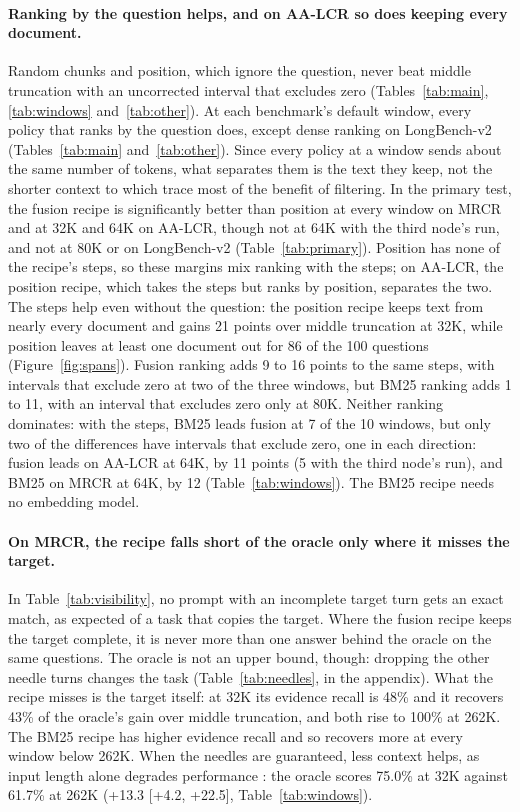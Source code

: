 \documentclass[letterpaper]{article} %
\newcommand{\recipe}{fusion recipe}
\begin{document}
\paragraph{Ranking by the question helps, and on AA-LCR so does keeping every document.} Random chunks and position, which ignore the question, never beat middle truncation with an uncorrected interval that excludes zero (Tables~\ref{tab:main}, \ref{tab:windows} and~\ref{tab:other}). At each benchmark's default window, every policy that ranks by the question does, except dense ranking on LongBench-v2 (Tables~\ref{tab:main} and~\ref{tab:other}). Since every policy at a window sends about the same number of tokens, what separates them is the text they keep, not the shorter context to which \citet{gao2026ink} trace most of the benefit of filtering. In the primary test, the \recipe{} is significantly better than position at every window on MRCR and at 32K and 64K on AA-LCR, though not at 64K with the third node's run, and not at 80K or on LongBench-v2 (Table~\ref{tab:primary}). Position has none of the recipe's steps, so these margins mix ranking with the steps; on AA-LCR, the position recipe, which takes the steps but ranks by position, separates the two. The steps help even without the question: the position recipe keeps text from nearly every document and gains 21 points over middle truncation at 32K, while position leaves at least one document out for 86 of the 100 questions (Figure~\ref{fig:spans}). Fusion ranking adds 9 to 16 points to the same steps, with intervals that exclude zero at two of the three windows, but BM25 ranking adds 1 to 11, with an interval that excludes zero only at 80K. Neither ranking dominates: with the steps, BM25 leads fusion at 7 of the 10 windows, but only two of the differences have intervals that exclude zero, one in each direction: fusion leads on AA-LCR at 64K, by 11 points (5 with the third node's run), and BM25 on MRCR at 64K, by 12 (Table~\ref{tab:windows}). The BM25 recipe needs no embedding model.

\paragraph{On MRCR, the recipe falls short of the oracle only where it misses the target.} In Table~\ref{tab:visibility}, no prompt with an incomplete target turn gets an exact match, as expected of a task that copies the target. Where the \recipe{} keeps the target complete, it is never more than one answer behind the oracle on the same questions. The oracle is not an upper bound, though: dropping the other needle turns changes the task (Table~\ref{tab:needles}, in the appendix). What the recipe misses is the target itself: at 32K its evidence recall is 48\% and it recovers 43\% of the oracle's gain over middle truncation, and both rise to 100\% at 262K. The BM25 recipe has higher evidence recall and so recovers more at every window below 262K. When the needles are guaranteed, less context helps, as input length alone degrades performance \cite{levy2024same,gao2026ink}: the oracle scores 75.0\% at 32K against 61.7\% at 262K (+13.3 [+4.2, +22.5], Table~\ref{tab:windows}).
\end{document}
